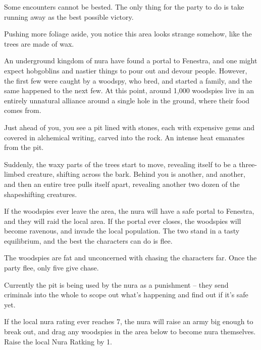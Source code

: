 \begin{multicols}{2}
Some encounters cannot be bested. The only thing for the party to do is take running away as the best possible victory.

\begin{boxtext}

	Pushing more foliage aside, you notice this area looks strange somehow, like the trees are made of wax.

\end{boxtext}

An underground kingdom of nura have found a portal to Fenestra, and one might expect hobgoblins and nastier things to pour out and devour people.
However, the first few were caught by a woodspy, who bred, and started a family, and the same happened to the next few.
At this point, around 1,000 woodspies live in an entirely unnatural alliance around a single hole in the ground, where their food comes from.

\begin{boxtext}

	Just ahead of you, you see a pit lined with stones, each with expensive gems and covered in alchemical writing, carved into the rock.
	An intense heat emanates from the pit.

	Suddenly, the waxy parts of the trees start to move, revealing itself to be a three-limbed creature, shifting across the bark.  Behind you is another, and another, and then an entire tree pulls itself apart, revealing another two dozen of the shapeshifting creatures.

\end{boxtext}

If the woodspies ever leave the area, the nura will have a safe portal to Fenestra, and they will raid the local area.
If the portal ever closes, the woodspies will become ravenous, and invade the local population.
The two stand in a tasty equilibrium, and the best the characters can do is flee.

The woodspies are fat and unconcerned with chasing the characters far.  Once the party flee, only five give chase.


\woodspy

Currently the pit is being used by the nura as a punishment -- they send criminals into the whole to scope out what's happening and find out if it's safe yet.

If the local nura rating ever reaches 7, the nura will raise an army big enough to break out, and drag any woodspies in the area below to become nura themselves.
Raise the local Nura Ratking by 1.


\end{multicols}
